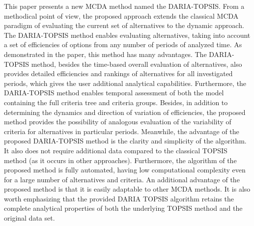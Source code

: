 \documentclass[final,5p,times,twocolumn,authoryear]{elsarticle}
\begin{document}
This paper presents a new MCDA method named the DARIA-TOPSIS. From a methodical point of view, the proposed approach extends the classical MCDA paradigm of evaluating the current set of alternatives to the dynamic approach. The DARIA-TOPSIS method enables evaluating alternatives, taking into account a set of efficiencies of options from any number of periods of analyzed time. As demonstrated in the paper, this method has many advantages. The DARIA-TOPSIS method, besides the time-based overall evaluation of alternatives, also provides detailed efficiencies and rankings of alternatives for all investigated periods, which gives the user additional analytical capabilities. Furthermore, the DARIA-TOPSIS method enables temporal assessment of both the model containing the full criteria tree and criteria groups. Besides, in addition to determining the dynamics and direction of variation of efficiencies, the proposed method provides the possibility of analogous evaluation of the variability of criteria for alternatives in particular periods. Meanwhile, the advantage of the proposed DARIA-TOPSIS method is the clarity and simplicity of the algorithm. It also does not require additional data compared to the classical TOPSIS method (as it occurs in other approaches). Furthermore, the algorithm of the proposed method is fully automated, having low computational complexity even for a large number of alternatives and criteria. An additional advantage of the proposed method is that it is easily adaptable to other MCDA methods. It is also worth emphasizing that the provided DARIA TOPSIS algorithm retains the complete analytical properties of both the underlying TOPSIS method and the original data set.
\end{document}
